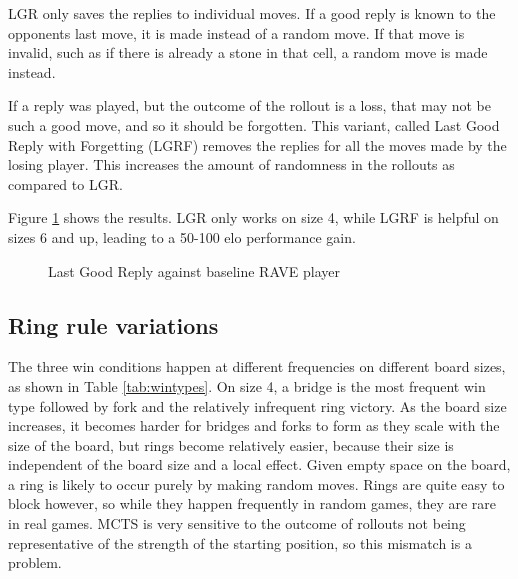 LGR only saves the replies to individual moves. If a good reply is known to the opponents last move, it is made instead of a random move. If that move is invalid, such as if there is already a stone in that cell, a random move is made instead.

If a reply was played, but the outcome of the rollout is a loss, that may not be such a good move, and so it should be forgotten. This variant, called Last Good Reply with Forgetting (LGRF) removes the replies for all the moves made by the losing player. This increases the amount of randomness in the rollouts as compared to LGR.

Figure \ref{fig:lgr} shows the results. LGR only works on size 4, while LGRF is helpful on sizes 6 and up, leading to a 50-100 elo performance gain.

\begin{figure}
	\centering
{}
	\caption{Last Good Reply against baseline RAVE player}
	\label{fig:lgr}
\end{figure}


\subsection{Ring rule variations}\label{sec:ringrules}

The three win conditions happen at different frequencies on different board sizes, as shown in Table \ref{tab:wintypes}. On size 4, a bridge is the most frequent win type followed by fork and the relatively infrequent ring victory. As the board size increases, it becomes harder for bridges and forks to form as they scale with the size of the board, but rings become relatively easier, because their size is independent of the board size and a local effect. Given empty space on the board, a ring is likely to occur purely by making random moves. Rings are quite easy to block however, so while they happen frequently in random games, they are rare in real games. MCTS is very sensitive to the outcome of rollouts not being representative of the strength of the starting position, so this mismatch is a problem.

